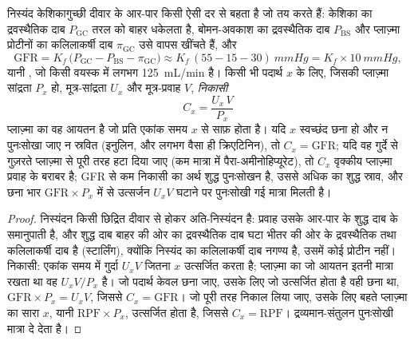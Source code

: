 \begin{theorem}[निस्यंदन और निकासी]\label{thm:b3:renal-osmoregulation:clearance}
निस्यंद केशिकागुच्छी दीवार के आर-पार किसी ऐसी दर से बहता है जो
\emph{} तय करते हैं: केशिका का द्रवस्थैतिक दाब
$P_{\text{GC}}$ तरल को बाहर धकेलता है, बोमन-अवकाश का द्रवस्थैतिक दाब
$P_{\text{BS}}$ और प्लाज़्मा प्रोटीनों का कलिलाकर्षी दाब
$\pi_{\text{GC}}$ उसे वापस खींचते हैं, और
\[
\text{GFR} = K_{f}\,\bigl(P_{\text{GC}} - P_{\text{BS}} - \pi_{\text{GC}}\bigr)
\approx K_{f}\,(55 - 15 - 30)\ \unit{mmHg} = K_{f}\times \qty{10}{mmHg},
\]
यानी \emph{}, जो किसी वयस्क में लगभग
\qty{125}{mL/min} है। किसी भी पदार्थ $x$ के लिए, जिसकी प्लाज़्मा
सांद्रता $P_{x}$ हो, मूत्र-सांद्रता $U_{x}$ और मूत्र-प्रवाह $V$,
\emph{निकासी}
\[
C_{x} = \frac{U_{x}\,V}{P_{x}}
\]
प्लाज़्मा का वह आयतन है जो प्रति एकांक समय $x$ से साफ़ होता है। यदि
$x$ स्वच्छंद छना हो और न पुनःसोखा जाए न स्रवित (इनुलिन, और लगभग वैसा ही
क्रिएटिनिन), तो $C_{x} = \text{GFR}$; यदि वह गुर्दे से गुज़रते
प्लाज़्मा से पूरी तरह हटा दिया जाए (कम मात्रा में पैरा-अमीनोहिप्यूरेट),
तो $C_{x}$ वृक्कीय प्लाज़्मा प्रवाह के बराबर है; GFR से कम निकासी का
अर्थ शुद्ध पुनःसोखन है, उससे अधिक का शुद्ध स्राव, और छना भार
$\text{GFR}
\times P_{x}$ में से उत्सर्जन $U_{x}V$ घटाने पर पुनःसोखी गई मात्रा
मिलती है।
\end{theorem}
\begin{proof}
निस्यंदन किसी छिद्रित दीवार से होकर अति-निस्यंदन है: प्रवाह उसके
आर-पार के शुद्ध दाब के समानुपाती है, और शुद्ध दाब बाहर की ओर का
द्रवस्थैतिक दाब घटा भीतर की ओर के द्रवस्थैतिक तथा कलिलाकर्षी दाब है
(स्टार्लिंग), क्योंकि निस्यंद का कलिलाकर्षी दाब नगण्य है, उसमें कोई
प्रोटीन नहीं। निकासी: एकांक समय में गुर्दा $U_{x}V$ जितना $x$ उत्सर्जित
करता है; प्लाज़्मा का जो आयतन इतनी मात्रा रखता था वह $U_{x}V/P_{x}$
है। जो पदार्थ केवल छना जाए, उसके लिए जो उत्सर्जित होता है वही छना था,
$\text{GFR}\times P_{x} = U_{x}V$, जिससे $C_{x} = \text{GFR}$। जो पूरी
तरह निकाल लिया जाए, उसके लिए बहते प्लाज़्मा का सारा $x$, यानी
$\text{RPF}\times P_{x}$, उत्सर्जित होता है, जिससे
$C_{x} = \text{RPF}$। द्रव्यमान-संतुलन पुनःसोखी मात्रा दे देता है।
\end{proof}

